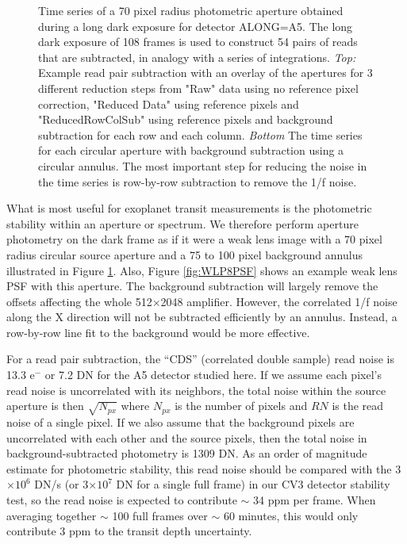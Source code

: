 \documentclass{aastex62}
\begin{document}
\begin{figure}[!hbtp]
\caption{Time series of a 70 pixel radius photometric aperture obtained during a long dark exposure for detector ALONG=A5. The long dark exposure of 108 frames is used to construct 54 pairs of reads that are subtracted, in analogy with a series of integrations.
{\it Top:}  Example read pair subtraction with an overlay of the apertures for 3 different reduction steps from "Raw" data using no reference pixel correction, "Reduced Data" using reference pixels and "ReducedRowColSub" using reference pixels and background subtraction for each row and each column.
{\it Bottom} The time series for each circular aperture with background subtraction using a circular annulus.
The most important step for reducing the noise in the time series is row-by-row subtraction to remove the 1/f noise.
}\label{fig:longDarkPhot}
\end{figure}

What is most useful for exoplanet transit measurements is the photometric stability within an aperture or spectrum.
We therefore perform aperture photometry on the dark frame as if it were a weak lens image with a 70 pixel radius circular source aperture and a 75 to 100 pixel background annulus illustrated in Figure \ref{fig:longDarkPhot}.
Also, Figure \ref{fig:WLP8PSF} shows an example weak lens PSF with this aperture.
The background subtraction will largely remove the offsets affecting the whole 512$\times$2048 amplifier.
However, the correlated 1/f noise along the X direction will not be subtracted efficiently by an annulus.
Instead, a row-by-row line fit to the background would be more effective.

For a read pair subtraction, the ``CDS'' (correlated double sample) read noise is 13.3 e$^-$ or 7.2 DN for the A5 detector studied here.
If we assume each pixel's read noise is uncorrelated with its neighbors, the total noise within the source aperture is then $\sqrt{N_{px}}$ where $N_{px}$ is the number of pixels and $RN$ is the read noise of a single pixel.
If we also assume that the background pixels are uncorrelated with each other and the source pixels, then the total noise in background-subtracted photometry is 1309 DN.
As an order of magnitude estimate for photometric stability, this read noise should be compared with the 3$\times 10^{6}$ DN/s (or 3$\times 10^7$ DN for a single full frame) in our CV3 detector stability test, so the read noise is expected to contribute $\sim$ 34 ppm per frame.
When averaging together $\sim$ 100 full frames over $\sim$ 60 minutes, this would only contribute 3 ppm to the transit depth uncertainty.
\end{document}

